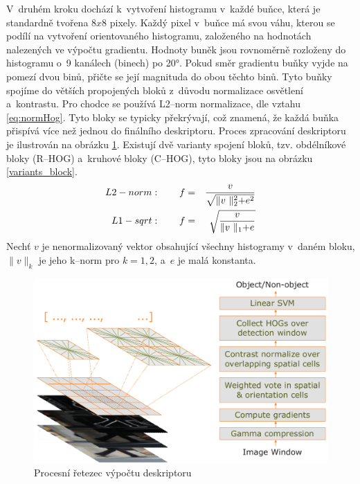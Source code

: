 V~druhém kroku dochází k~vytvoření histogramu v~každé buňce, která je standardně tvořena $8x8$ pixely. Každý pixel v~buňce má svou váhu, kterou se podílí na vytvoření orientovaného histogramu, založeného na hodnotách nalezených ve výpočtu gradientu. Hodnoty buněk jsou rovnoměrně rozloženy do histogramu o~9 kanálech (binech) po \ang{20}. Pokud směr gradientu buňky vyjde na pomezí dvou binů, přičte se její magnituda do obou těchto binů.
Tyto buňky spojíme do větších propojených bloků z~důvodu normalizace osvětlení a~kontrastu. Pro chodce se používá L2--norm normalizace, dle vztahu \eqref{eq:normHog}. Tyto bloky se typicky překrývají, což znamená, že každá buňka přispívá více než jednou do finálního deskriptoru. Proces zpracování deskriptoru je ilustrován na obrázku \ref{hog_chain}. Existují dvě varianty spojení bloků, tzv. obdélníkové bloky (R--HOG) a~kruhové bloky (C--HOG), tyto bloky jsou na obrázku \ref{variants_block}.  
\begin{equation}
\centering
 \label{eq:normHog}
 \begin{aligned}
L2-norm&: \qquad  f =& \frac{v}{\sqrt{\lVert v~\lVert_2^2 + e^2}} \\
L1-sqrt&: \qquad  f =& \sqrt{\frac{v}{\lVert v~\lVert_1 + e}}
 \end{aligned}
\end{equation}
Nechť $v$ je nenormalizovaný vektor obsahující všechny histogramy v~daném bloku, $\lVert v \lVert_k$ je jeho k--norm pro $k = 1,2$, a~$e$ je malá konstanta.
 \begin{figure}[H]
\centering
\includegraphics[width=16cm]{figures/hog_pipeline}
\caption{Procesní řetezec výpočtu deskriptoru \cite{hog:dalal}}
\label{hog_chain}
\end{figure}

